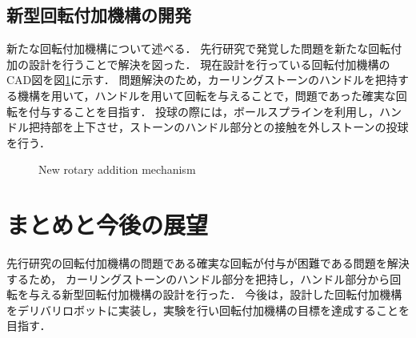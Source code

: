 \documentclass{classes/sice-si}
\begin{document}
\subsection{新型回転付加機構の開発}
新たな回転付加機構について述べる．
先行研究で発覚した問題を新たな回転付加の設計を行うことで解決を図った．
現在設計を行っている回転付加機構のCAD図を図\ref{fig:new}に示す．
問題解決のため，カーリングストーンのハンドルを把持する機構を用いて，ハンドルを用いて回転を与えることで，問題であった確実な回転を付与することを目指す．
投球の際には，ボールスプラインを利用し，ハンドル把持部を上下させ，ストーンのハンドル部分との接触を外しストーンの投球を行う．
\begin{figure}[H]
    \centering
    \begin{minipage}{0.6\linewidth}
        \caption{New rotary addition mechanism}
        \label{fig:new}
    \end{minipage}
    \centering
    \vspace{0pt} %
\end{figure}


\section{まとめと今後の展望}
先行研究の回転付加機構の問題である確実な回転が付与が困難である問題を解決するため，
カーリングストーンのハンドル部分を把持し，ハンドル部分から回転を与える新型回転付加機構の設計を行った．
今後は，設計した回転付加機構をデリバリロボットに実装し，実験を行い回転付加機構の目標を達成することを目指す．



\printbibliography[title=参考文献]
\end{document}
